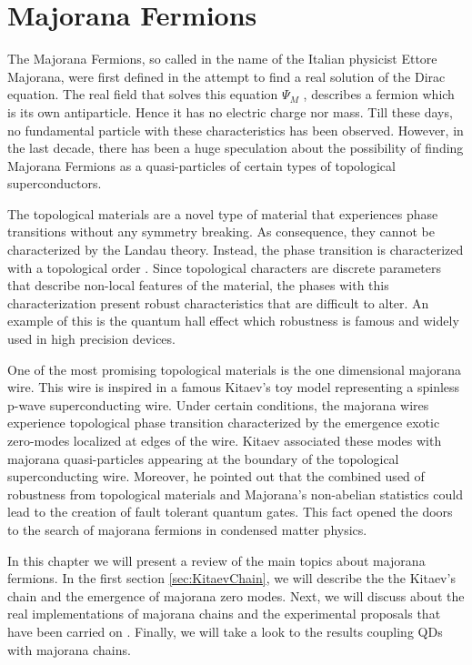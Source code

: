 \chapter{Majorana Fermions \label{chap:Majorana}}

The  Majorana Fermions, so called in the name of the Italian physicist Ettore Majorana, were first defined in the attempt to find a real solution of the Dirac equation. The real field that solves this equation $\Psi_M$ , describes a fermion which is its own antiparticle. Hence it has no electric charge nor mass.  Till these days, no fundamental particle with these characteristics has been observed. However, in the last decade, there has been a huge speculation about the possibility of finding Majorana Fermions as a quasi-particles of certain types of topological superconductors.

The topological materials are a novel type of material that experiences phase transitions without any symmetry breaking. As consequence, they cannot be characterized by the Landau theory. Instead, the phase transition is characterized with a topological order . Since topological characters are discrete parameters that describe non-local features of the material, the phases with this characterization present robust characteristics that are difficult to alter. An example of this is the quantum hall effect which robustness is famous and widely used in high precision devices. 

One of the most promising topological materials is the one dimensional majorana wire. This wire is inspired in a famous Kitaev's toy model representing a spinless p-wave superconducting wire. Under certain conditions, the majorana wires experience topological phase transition characterized by the emergence exotic zero-modes localized at edges of the wire. Kitaev associated these modes with majorana quasi-particles  appearing at the boundary of the topological superconducting wire. Moreover, he pointed out that the combined used of robustness from topological materials and Majorana's non-abelian statistics could lead to the creation of fault tolerant quantum gates. This fact opened the doors to the search of majorana fermions in condensed matter physics. 

In this chapter we will present a review of the main topics about majorana fermions. In the first section \ref{sec:KitaevChain}, we will describe the the Kitaev's chain and the emergence of majorana zero modes. Next, we will discuss about the real implementations of majorana chains and the experimental proposals that have been carried on . Finally, we will take a look to the results coupling QDs with majorana chains.



